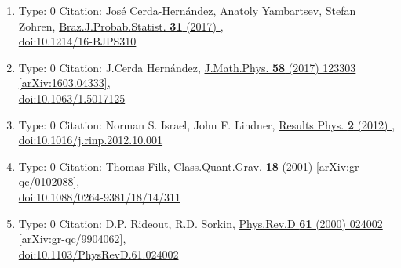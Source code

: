 \documentclass[a4paper,10pt]{article}
\begin{document}
\begin{enumerate}
\begin{enumerate}
  \item Type: 0 Citation: José Cerda-Hernández, Anatoly Yambartsev, Stefan Zohren, \href{https://www.doi.org/10.1214/16-BJPS310}{Braz.J.Probab.Statist. {\bf 31} (2017) },\\\href{https://www.doi.org/10.1214/16-BJPS310}{doi:10.1214/16-BJPS310}
  \item Type: 0 Citation: J.Cerda Hernández, \href{https://www.doi.org/10.1063/1.5017125}{J.Math.Phys. {\bf 58} (2017) 123303}  \href{https://arxiv.org/abs/1603.04333}{[arXiv:1603.04333]},\\\href{https://www.doi.org/10.1063/1.5017125}{doi:10.1063/1.5017125}
  \item Type: 0 Citation: Norman S. Israel, John F. Lindner, \href{https://www.doi.org/10.1016/j.rinp.2012.10.001}{Results Phys. {\bf 2} (2012) },\\\href{https://www.doi.org/10.1016/j.rinp.2012.10.001}{doi:10.1016/j.rinp.2012.10.001}
  \item Type: 0 Citation: Thomas Filk, \href{https://www.doi.org/10.1088/0264-9381/18/14/311}{Class.Quant.Grav. {\bf 18} (2001) }  \href{https://arxiv.org/abs/gr-qc/0102088}{[arXiv:gr-qc/0102088]},\\\href{https://www.doi.org/10.1088/0264-9381/18/14/311}{doi:10.1088/0264-9381/18/14/311}
  \item Type: 0 Citation: D.P. Rideout, R.D. Sorkin, \href{https://www.doi.org/10.1103/PhysRevD.61.024002}{Phys.Rev.D {\bf 61} (2000) 024002}  \href{https://arxiv.org/abs/gr-qc/9904062}{[arXiv:gr-qc/9904062]},\\\href{https://www.doi.org/10.1103/PhysRevD.61.024002}{doi:10.1103/PhysRevD.61.024002}

\end{enumerate}
\end{enumerate}
\end{document}
